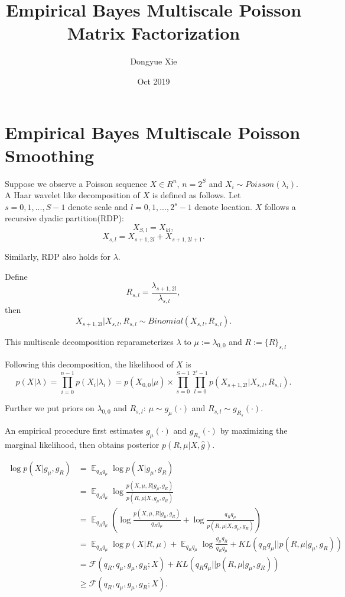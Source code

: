 \documentclass{article}
\title{Empirical Bayes Multiscale Poisson Matrix Factorization}
\author{Dongyue Xie }
\date{Oct 2019}
\DeclareMathOperator{\E}{\mathbb{E}}
\begin{document}
\maketitle

\section{Empirical Bayes Multiscale Poisson Smoothing}

Suppose we observe a Poisson sequence $X\in R^n$, $n=2^S$ and $X_i\sim Poisson(\lambda_i)$. A Haar wavelet like decomposition of $X$ is defined as follows. Let $s = 0,1,...,S-1$ denote scale and $l = 0,1,..., 2^s-1$ denote location. $X$ follows a recursive dyadic partition(RDP):
\[X_{S,l} = X_{kl},\]
\[X_{s,l} = X_{s+1,2l}+X_{s+1,2l+1}.\]

Similarly, RDP also holds for $\lambda$.

Define 
\[R_{s,l} = \frac{\lambda_{s+1,2l}}{\lambda_{s,l}},\]
then 
\[X_{s+1,2l}|X_{s,l},R_{s,l}\sim Binomial(X_{s,l},R_{s,l}).\]

This multiscale decomposition reparameterizes $\lambda$ to $\mu:=\lambda_{0,0}$ and $R:=\{R\}_{s,l}$

Following this decomposition, the likelihood of $X$ is 
\begin{equation}
    p(X|\lambda) = \prod_{i=0}^{n-1} p(X_i|\lambda_i) = p(X_{0,0}|\mu)\times \prod_{s=0}^{S-1}\prod_{l=0}^{2^s-1} p(X_{s+1,2l}|X_{s,l},R_{s,l}).
\end{equation}

Further we put priors on $\lambda_{0,0}$ and $R_{s,l}$: $\mu\sim g_\mu(\cdot)$ and $R_{s,l}\sim g_{R_s}(\cdot)$.

An empirical procedure first estimates $g_\mu(\cdot)$ and $g_{R_s}(\cdot)$ by maximizing the marginal likelihood, then obtains posterior $p(R,\mu|X,\hat{g})$.

\begin{equation}
    \begin{split}
        \log p(X|g_\mu,g_R) & = \E_{q_Rq_\mu}\log p(X|g_\mu,g_R)
        \\ & = \E_{q_Rq_\mu}\log \frac{p(X,\mu,R|g_\mu,g_R)}{p(R,\mu|X,g_\mu,g_R)}
        \\ & = \E_{q_Rq_\mu}(\log\frac{p(X,\mu,R|g_\mu,g_R)}{q_Rq_\mu}+\log\frac{q_Rq_\mu}{p(R,\mu|X,g_\mu,g_R)})
        \\ & = \E_{q_Rq_\mu}\log p(X|R,\mu) + \E_{q_Rq_\mu}\log \frac{g_\mu g_R}{q_Rq_\mu} + KL(q_Rq_\mu||p(R,\mu|g_\mu,g_R))
        \\ & = \mathcal{F}(q_R,q_\mu,g_\mu,g_R; X) + KL(q_Rq_\mu||p(R,\mu|g_\mu,g_R))
        \\ & \geq \mathcal{F}(q_R,q_\mu,g_\mu,g_R; X).
    \end{split}
\end{equation}
\end{document}
